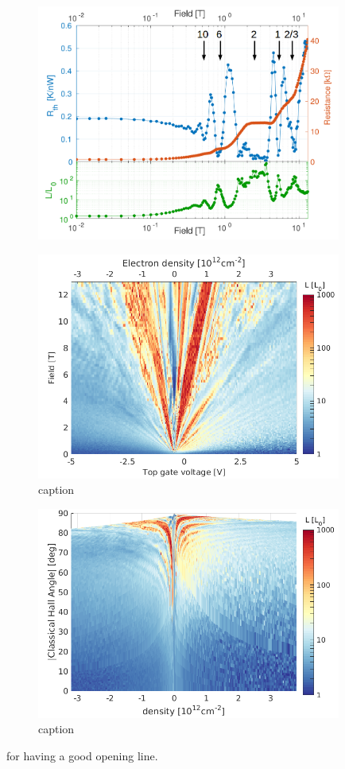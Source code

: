 \begin{figure}
\centering
\includegraphics[width=100mm]{figures/magneto/Low_density.png}
\label{fig:m_low_density}
\end{figure}

\begin{figure}
\centering
\includegraphics[width=100mm]{figures/magneto/Fan_L.png}
\caption{caption}
\label{fig:m_L}
\end{figure}

\begin{figure}
\centering
\includegraphics[width=100mm]{figures/magneto/L_n_Ha.png}
\caption{caption}
\label{fig:m_L_n_Ha}
\end{figure}





 for having a good opening line. 
